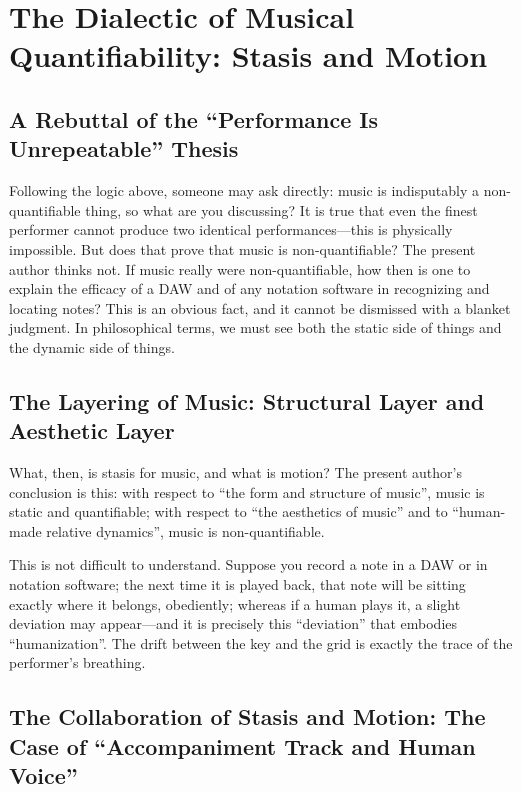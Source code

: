 \documentclass[11pt,a4paper]{article}
\begin{document}
\section{The Dialectic of Musical Quantifiability: Stasis and Motion}

\subsection{A Rebuttal of the ``Performance Is Unrepeatable'' Thesis}

Following the logic above, someone may ask directly: music is indisputably a
non-quantifiable thing, so what are you discussing? It is true that even the finest
performer cannot produce two identical performances---this is physically impossible. But
does that prove that music is non-quantifiable? The present author thinks not. If music
really were non-quantifiable, how then is one to explain the efficacy of a DAW and of any
notation software in recognizing and locating notes? This is an obvious fact, and it cannot
be dismissed with a blanket judgment. In philosophical terms, we must see both the static
side of things and the dynamic side of things.

\subsection{The Layering of Music: Structural Layer and Aesthetic Layer}

What, then, is stasis for music, and what is motion? The present author's conclusion is
this: with respect to ``the form and structure of music'', music is static and
quantifiable; with respect to ``the aesthetics of music'' and to ``human-made relative
dynamics'', music is non-quantifiable.

This is not difficult to understand. Suppose you record a note in a DAW or in notation
software; the next time it is played back, that note will be sitting exactly where it
belongs, obediently; whereas if a human plays it, a slight deviation may appear---and it is
precisely this ``deviation'' that embodies ``humanization''. The drift between the key and
the grid is exactly the trace of the performer's breathing.

\subsection{The Collaboration of Stasis and Motion: The Case of ``Accompaniment Track and Human Voice''}
\end{document}
